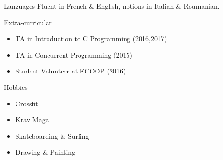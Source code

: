 


\begin{cvskills}


\cvskill
{Languages} %
{Fluent in French \& English, notions in Italian \& Roumanian.} %

\cvskill
{Extra-curricular}
{
	\begin{itemize}
	\item TA in Introduction to C Programming (2016,2017)
	\item TA in Concurrent Programming (2015)
	\item Student Volunteer at ECOOP (2016)
	\end{itemize}
}

\cvskill
{Hobbies}
{
	\begin{itemize}
		\item Crossfit
		\item Krav Maga
		\item Skateboarding \& Surfing
		\item Drawing \& Painting 
	\end{itemize}
}

\end{cvskills}